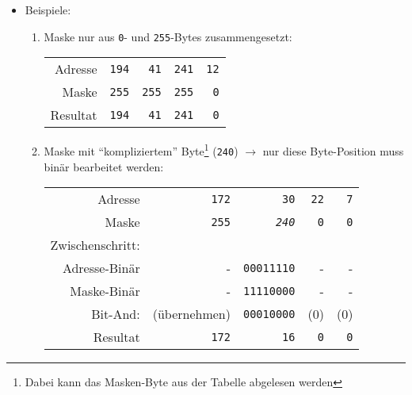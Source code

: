 \documentclass[a4paper,german]{scrartcl}
\begin{document}
\begin{itemize}
\begin{itemize}
   \item Beispiele:
     \begin{enumerate}
      \item Maske nur aus \texttt{0}- und \texttt{255}-Bytes zusammengesetzt:
      \begin{center}
        \begin{tabular}{r|r r r r}
          Adresse & \texttt{194} & \texttt{41} & \texttt{241} & \texttt{12} \\
          Maske   & \texttt{255} & \texttt{255} & \texttt{255} & \texttt{0} \\
          \hline
          Resultat & \texttt{194} & \texttt{41} & \texttt{241} & \texttt{0} \\
        \end{tabular}
      \end{center}
      \vspace{0.25cm}

      \item Maske mit ``kompliziertem'' Byte\footnote{Dabei kann das Masken-Byte aus der Tabelle abgelesen werden} (\texttt{240}) $\rightarrow$ nur diese Byte-Position muss bin\"ar bearbeitet werden:
      \begin{center}
        \begin{tabular}{r|r r r r}
          Adresse & \texttt{172} & \texttt{30} & \texttt{22} & \texttt{7} \\
          Maske   & \texttt{255} & \emph{\texttt{240}} & \texttt{0} & \texttt{0} \\
          \hline
          Zwischenschritt: \\
          Adresse-Bin\"ar & - & \texttt{00011110} & - & - \\
          Maske-Bin\"ar & - & \texttt{11110000} & - & - \\
          \hline
          Bit-And: & (\"ubernehmen) & \texttt{00010000} & (0) & (0) \\
          \hline
          Resultat & \texttt{172} & \texttt{16} & \texttt{0} & \texttt{0} \\
        \end{tabular}
      \end{center}
     \end{enumerate}


\end{itemize}
\end{itemize}
\end{document}
